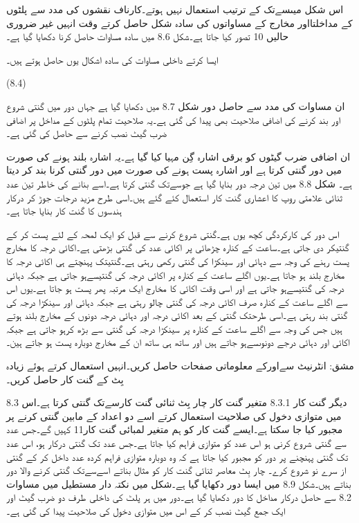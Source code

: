 	اس شکل میںسےتک کے ترتیب استعمال نہیں ہوتے۔کارناف نقشوں کی مدد سے پلٹوں کے مداخلتااور مخارج کے مساواتوں کی سادہ شکل حاصل کرتے وقت انہیں غیر ضروری حالیں 10 تصور کیا جاتا ہے۔شکل 8.6 میں سادہ مساوات حاصل کرنا دکھایا گیا ہے۔


	ایسا کرتے داخلی مساوات کی سادہ اشکال یوں حاصل ہوتے ہیں۔

 
(8.4)

ان مساوات کی مدد سے حاصل دور شکل 8.7 میں دکھایا گیا ہے جہاں دور میں گنتی شروع اور بند کرنے کی اضافی صلاحیت بھی پیدا کی گئی ہے۔یہ صلاحیت تمام پلٹوں کے مداخل پر اضافی ضرب گیٹ نصب کرنے سے حاصل کی گئی ہے۔



	ان اضافی ضرب گیٹوں کو برقی اشارہ گِن مہیا کیا گیا ہے۔یہ اشارہ بلند ہونے کی صورت میں دور گنتی کرتا ہے اور اشارہ پست ہونے کی صورت میں دور گنتی کرنا بند کر دیتا ہے۔
	شکل 8.8 میں تین درجہ دور بنایا گیا ہے جوسےتک گنتی کرتا ہے۔اسے بنانے کی خاطر تین عدد ثنائی علامتی روپ کا اعشاری  گنت کار استعمال کئے گئے ہیں۔اسی طرح مزید درجات جوڑ کر درکار ہندسوں کا  گنت کار بنایا جاتا ہے۔ 



	اس دور کی کارکردگی کچھ یوں ہے۔گنتی شروع کرنے سے قبل کو ایک لمحہ کے لئے پست کر کے گنتیکر دی جاتی ہے۔ساعت کے کنارہ چڑھائی پر اکائی عدد کی گنتی بڑھتی ہے۔اکائی درجہ کا مخارج پست رہنے کی وجہ سے دہائی اور سینکڑا کی گنتی رکھی رہتی ہے۔گنتیتک پہنچتے ہی اکائی درجہ کا مخارج بلند ہو جاتا ہے۔یوں اگلے ساعت کے کنارہ پر اکائی درجہ کی گنتیسےہو جاتی ہے جبکہ دہائی درجہ کی گنتیسےہو جاتی ہے اور اسی وقت اکائی کا مخارج ایک مرتبہ پھر پست ہو جاتا ہے۔یوں اس سے اگلے ساعت کے کنارہ صرف اکائی درجہ کی گنتی چالو رہتی ہے جبکہ دہائی اور سینکڑا درجہ کی گنتی بند رہتی ہے۔اسی طرحتک گنتی کے بعد اکائی درجہ اور دہائی درجہ دونوں کے مخارج بلند ہوتے ہیں جس کی وجہ سے اگلے ساعت کے کنارہ پر سینکڑا درجہ کی گنتی سے بڑھ کرہو جاتی ہے جبکہ اکائی اور دہائی درجے دونوںسےہو جاتے ہیں اور ساتھ ہی ساتھ ان کے مخارج  دوبارہ پست ہو جاتے ہین۔

مشق:	انٹرنیٹ سےاورکے معلوماتی صفحات حاصل کریں۔انہیں استعمال کرتے ہوئے زیادہ بِٹ کے گنت کار حاصل کریں۔

8.3 دیگر گنت کار
8.3.1 متغیر گنت کار
	چار بِٹ ثنائی گنت کارسےتک گنتی کرتا ہے۔اس میں متوازی دخول کی صلاحیت استعمال کرتے اسے دو اعداد کے مابین گنتی کرنے پر مجبور کیا جا سکتا ہے۔ایسے گنت کار کو ہم متغیر لمبائی گنت کار11 کہیں گے۔جس عدد سے گنتی شروع کرنی ہو اس عدد کو متوازی فراہم کیا جاتا ہے۔جس عدد تک گنتی درکار ہو، اس عدد تک گنتی پہنچنے پر دور کو مجبور کیا جاتا ہے کہ وہ دوبارہ متوازی فراہم کردہ عدد داخل کر کے گنتی از سرے نو شروع کرے۔
	چار بِٹ معاصر ثنائی گنت کار کو مثال بناتے اسےسےتک گنتی کرنے والا دور بناتے ہیں۔شکل 8.9 میں ایسا دور دکھایا گیا ہے۔شکل میں نکتہ دار مستطیل میں مساوات 8.2 سے حاصل درکار مداخل کا دور دکھایا گیا ہے۔دور میں ہر پلٹ کی داخلی طرف دو ضرب گیٹ اور ایک جمع گیٹ نصب کر کے اس میں متوازی دخول کی صلاحیت پیدا کی گئی ہے۔

